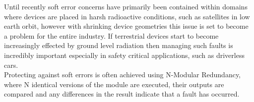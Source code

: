 Until recently soft error concerns have primarily been contained within domains where
devices are placed in harsh radioactive conditions, such as satellites in low earth orbit, however
with shrinking device geometries this issue is set to become a problem for the entire
industry\cite{ibe2010impact}.
If terrestrial devices start to become increasingly effected by ground level radiation
then managing such faults is incredibly important especially in safety critical applications, such
as driverless cars.\\

Protecting against soft errors is often achieved using N-Modular Redundancy, where N identical
versions of the module are executed, their outputs are compared and any differences in the
result indicate that a fault has occurred.




